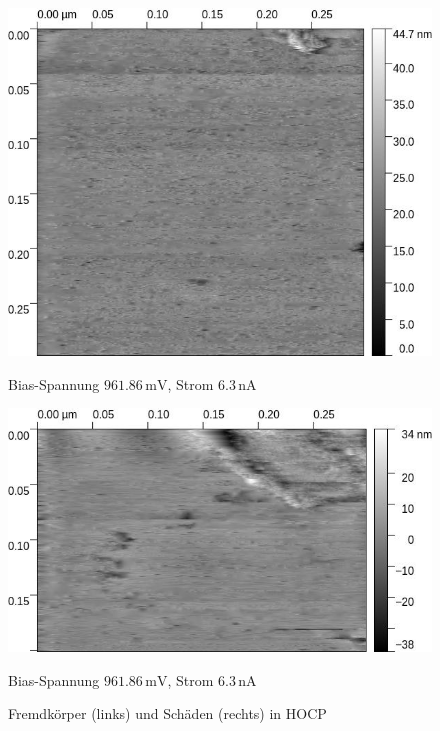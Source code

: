 \documentclass[12pt,a4paper]{scrartcl}
\numberwithin{equation}{section} %
\begin{document}
\begin{figure}[h!]
	\begin{minipage}{\textwidth}
		\begin{minipage}[T]{0.5\textwidth}
			\includegraphics[width=\textwidth]{../media/B2.5/Graphit_3.jpg}
			\caption{Bias-Spannung $961.86 \mathrm{\,mV}$,
				Strom $6.3 \mathrm{\,nA}$}
		\end{minipage}
		\begin{minipage}[T]{0.5\textwidth}
			\includegraphics[width=\textwidth]{../media/B2.5/Graphit_1.jpg}
			\caption{Bias-Spannung $961.86 \mathrm{\,mV}$,
				Strom $6.3 \mathrm{\,nA}$}
		\end{minipage}
		\caption{Fremdkörper (links) und Schäden (rechts) in HOCP}
		\label{abb:hocp own: Fremdkörper}
	\end{minipage}
	\begin{minipage}{\textwidth}

\end{minipage}
\end{figure}
\end{document}
